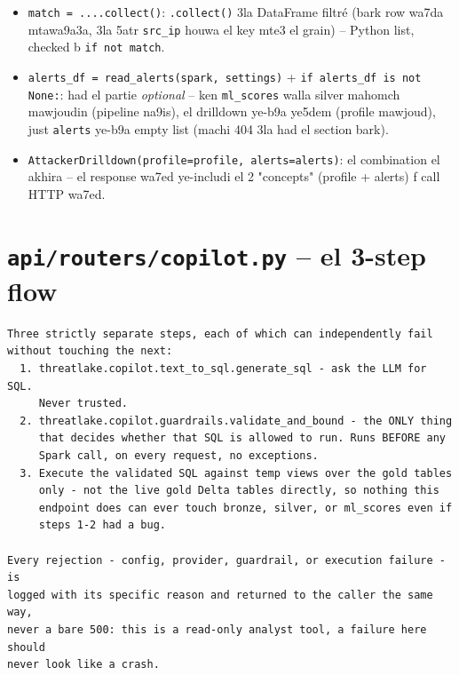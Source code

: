 \documentclass[11pt,a4paper]{report}
\DeclareRobustCommand{\code}[1]{\texttt{#1}}
\DeclareRobustCommand{\file}[1]{\texttt{\color{amber}#1}}
\begin{document}
\begin{itemize}
  \item \code{match = ....collect()}: \code{.collect()} 3la DataFrame
        filtré (bark row wa7da mtawa9a3a, 3la 5atr \code{src\_ip} houwa
        el key mte3 el grain) -- Python list, checked b \code{if not
        match}.
  \item \code{alerts\_df = read\_alerts(spark, settings)} + \code{if
        alerts\_df is not None:}: had el partie \emph{optional} -- ken
        \code{ml\_scores} walla silver mahomch mawjoudin (pipeline
        na9is), el drilldown ye-b9a ye5dem (profile mawjoud), just
        \code{alerts} ye-b9a empty list (machi 404 3la had el section
        bark).
  \item \code{AttackerDrilldown(profile=profile, alerts=alerts)}: el
        combination el akhira -- el response wa7ed ye-includi el 2
        "concepts" (profile + alerts) f call HTTP wa7ed.
\end{itemize}

\section{\file{api/routers/copilot.py} -- el 3-step flow}

\begin{lstlisting}[style=pystyle]
Three strictly separate steps, each of which can independently fail
without touching the next:
  1. threatlake.copilot.text_to_sql.generate_sql - ask the LLM for SQL.
     Never trusted.
  2. threatlake.copilot.guardrails.validate_and_bound - the ONLY thing
     that decides whether that SQL is allowed to run. Runs BEFORE any
     Spark call, on every request, no exceptions.
  3. Execute the validated SQL against temp views over the gold tables
     only - not the live gold Delta tables directly, so nothing this
     endpoint does can ever touch bronze, silver, or ml_scores even if
     steps 1-2 had a bug.

Every rejection - config, provider, guardrail, or execution failure - is
logged with its specific reason and returned to the caller the same way,
never a bare 500: this is a read-only analyst tool, a failure here should
never look like a crash.
\end{lstlisting}
\end{document}
